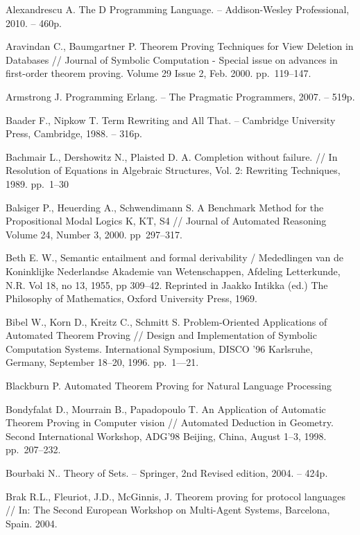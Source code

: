 \begin{thebibliography}{99}


 Alexandrescu A. The D Programming Language. -- Addison-Wesley Professional, 2010. -- 460p.

 Aravindan C., Baumgartner P. Theorem Proving Techniques for View Deletion in Databases // Journal of Symbolic Computation - Special issue on advances in first-order theorem proving. Volume 29 Issue 2, Feb. 2000. pp.~119--147.

 Armstrong J. Programming Erlang.  -- The Pragmatic Programmers, 2007. -- 519p.

 Baader F., Nipkow T. Term Rewriting and All That. -- Cambridge University Press, Cambridge, 1988. -- 316p.

 Bachmair L., Dershowitz N., Plaisted D. A. Completion without failure. // In Resolution of Equations in Algebraic Structures, Vol. 2: Rewriting Techniques, 1989. pp.~1--30

 Balsiger P., Heuerding A., Schwendimann S. A Benchmark Method for the Propositional Modal Logics K, KT, S4 // Journal of Automated Reasoning Volume 24, Number 3, 2000. pp~297--317.

 Beth E. W., Semantic entailment and formal derivability / Mededlingen van de Koninklijke Nederlandse Akademie van Wetenschappen, Afdeling Letterkunde, N.R. Vol 18, no 13, 1955, pp 309–42. Reprinted in Jaakko Intikka (ed.) The Philosophy of Mathematics, Oxford University Press, 1969.


 Bibel W., Korn D., Kreitz C., Schmitt S. Problem-Oriented Applications of Automated Theorem Proving // Design and Implementation of Symbolic Computation Systems. International Symposium, DISCO '96 Karlsruhe, Germany, September 18–20, 1996. pp.~1---21.

 Blackburn P. Automated Theorem Proving for Natural Language Processing

 Bondyfalat D., Mourrain B., Papadopoulo T. An Application of Automatic Theorem Proving in Computer vision // Automated Deduction in Geometry. Second International Workshop, ADG’98 Beijing, China, August 1–3, 1998. pp.~207--232.

 Bourbaki N.. Theory of Sets. -- Springer, 2nd Revised edition, 2004. -- 424p.

 Brak R.L., Fleuriot, J.D., McGinnis, J. Theorem proving for protocol languages // In: The Second European Workshop on Multi-Agent Systems, Barcelona, Spain. 2004.


\end{thebibliography}
